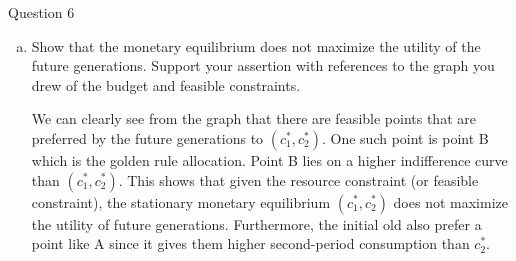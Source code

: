 \documentclass[a4paper]{article}
\newif\IfInSansMode
\numberwithin{equation}{section}
\numberwithin{figure}{section}
\begin{document}
\begin{questionbox}{Question 6}
\begin{enumerate}[(a)]
			\item Show that the monetary equilibrium does not maximize the utility of the future generations. Support your assertion with references to the graph you drew of the budget and feasible constraints.
			\begin{explanationbox}
				We can clearly see from the graph that there are feasible points that are preferred by the future generations to \( (c_1^*,c_2^*) \). One such point is point B which is the golden rule allocation. Point B lies on a higher indifference curve than \( (c_1^*,c_2^*) \). This shows that given the resource constraint (or feasible constraint), the stationary monetary equilibrium \( (c_1^*,c_2^*) \) does not maximize the utility of future generations. Furthermore, the initial old also prefer a point like A since it gives them higher second-period consumption than \( c_2^* \).
			\end{explanationbox}
		\end{enumerate}
	\end{questionbox}
\end{document}
